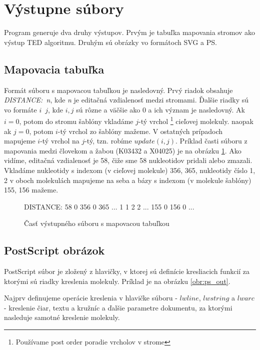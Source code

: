 \section{Výstupne súbory}

Program generuje dva druhy výstupov. Prvým je tabuľka mapovania stromov
ako výstup TED algoritmu. Druhým sú obrázky vo formátoch SVG a PS.

\subsection{Mapovacia tabuľka}

Formát súboru s mapovacou tabuľkou je nasledovný. Prvý riadok obsahuje
\mbox{\textit{DISTANCE: n}}, kde \textit{n} je editačná vzdialenosť
medzi stromami.
Ďalšie riadky sú vo formáte \mbox{$i$ $j$}, kde \mbox{$i, j$} sú rôzne a väčšie ako 0
a ich význam je nasledovný.
Ak \mbox{$i = 0$}, potom do stromu šablóny vkladáme $j$-tý vrchol%
\footnote{Používame post order poradie vrcholov v strome} cieľovej molekuly.
naopak ak \mbox{$j = 0$}, potom $i$-tý vrchol zo šablóny mažeme. V ostatných prípadoch
mapujeme $i$-tý vrchol na $j$-tý, tzn. robíme \mbox{$update(i, j)$}.
Príklad časti súboru z mapovania medzi človekom a žabou (K03432 a X04025)
je na obrázku \ref{obr:mapping_format}.
Ako vidíme, editačná vzdialenosť je 58, čiže sme 58 nukleotidov pridali alebo zmazali.
Vkladáme nukleotidy s indexom (v cieľovej molekule) 356, 365,
nukleotidy číslo 1, 2 v oboch molekulách mapujeme na seba a bázy
s indexom (v molekule šablóny) 155, 156 mažeme.

\begin{figure}
\begin{code}[fontsize=\scriptsize, frame=none, samepage=true]
DISTANCE: 58
0 356
0 365
  ...
1 1
2 2
  ...
155 0
156 0
  ...
\end{code}
\caption{Časť výstupného súboru s mapovacou tabuľkou}
\label{obr:mapping_format}
\end{figure}




\subsection{PostScript obrázok}

PostScript súbor je zložený z hlavičky, v ktorej sú definície kresliacich funkcií za
ktorými sú riadky kreslenia molekuly. Príklad je na obrázku \ref{obr:ps_out}.

Najprv definujeme operácie kreslenia v hlavičke súboru - $lwline$,
$lwstring$ a $lwarc$ - kreslenie čiar, textu a kružníc a ďalšie 
parametre dokumentu, za ktorými nasleduje samotné kreslenie molekuly.

